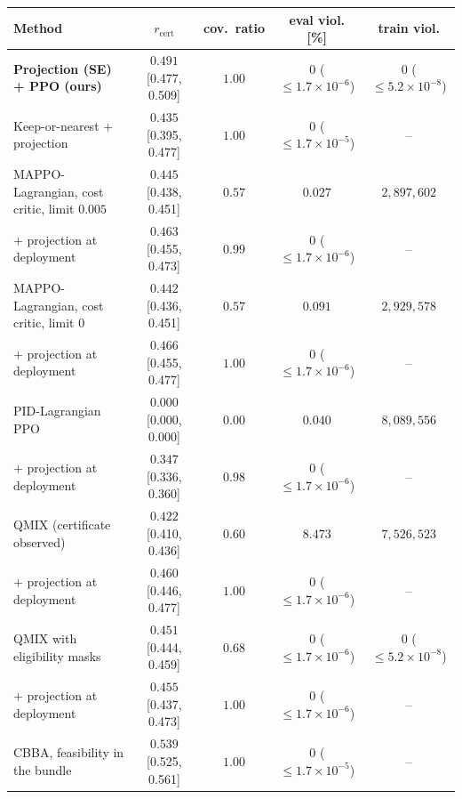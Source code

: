 \begin{tabular}{@{}lcccc@{}}
\toprule
Method & $r_{\mathrm{cert}}$ & cov.\ ratio & eval viol. [\%] & train viol.\\
\midrule
\textbf{Projection (SE) + PPO (ours)} & $0.491$ {\scriptsize[0.477, 0.509]} & $1.00$ & $0$ ($\le1.7\times10^{-6}$) & $0$ ($\le5.2\times10^{-8}$) \\
Keep-or-nearest + projection & $0.435$ {\scriptsize[0.395, 0.477]} & $1.00$ & $0$ ($\le1.7\times10^{-5}$) & -- \\
\midrule
MAPPO-Lagrangian, cost critic, limit $0.005$ & $0.445$ {\scriptsize[0.438, 0.451]} & $0.57$ & $0.027$ & $2{,}897{,}602$ \\
\quad + projection at deployment & $0.463$ {\scriptsize[0.455, 0.473]} & $0.99$ & $0$ ($\le1.7\times10^{-6}$) & -- \\
MAPPO-Lagrangian, cost critic, limit $0$ & $0.442$ {\scriptsize[0.436, 0.451]} & $0.57$ & $0.091$ & $2{,}929{,}578$ \\
\quad + projection at deployment & $0.466$ {\scriptsize[0.455, 0.477]} & $1.00$ & $0$ ($\le1.7\times10^{-6}$) & -- \\
PID-Lagrangian PPO & $0.000$ {\scriptsize[0.000, 0.000]} & $0.00$ & $0.040$ & $8{,}089{,}556$ \\
\quad + projection at deployment & $0.347$ {\scriptsize[0.336, 0.360]} & $0.98$ & $0$ ($\le1.7\times10^{-6}$) & -- \\
QMIX (certificate observed) & $0.422$ {\scriptsize[0.410, 0.436]} & $0.60$ & $8.473$ & $7{,}526{,}523$ \\
\quad + projection at deployment & $0.460$ {\scriptsize[0.446, 0.477]} & $1.00$ & $0$ ($\le1.7\times10^{-6}$) & -- \\
QMIX with eligibility masks & $0.451$ {\scriptsize[0.444, 0.459]} & $0.68$ & $0$ ($\le1.7\times10^{-6}$) & $0$ ($\le5.2\times10^{-8}$) \\
\quad + projection at deployment & $0.455$ {\scriptsize[0.437, 0.473]} & $1.00$ & $0$ ($\le1.7\times10^{-6}$) & -- \\
CBBA, feasibility in the bundle & $0.539$ {\scriptsize[0.525, 0.561]} & $1.00$ & $0$ ($\le1.7\times10^{-5}$) & -- \\
\bottomrule
\end{tabular}
